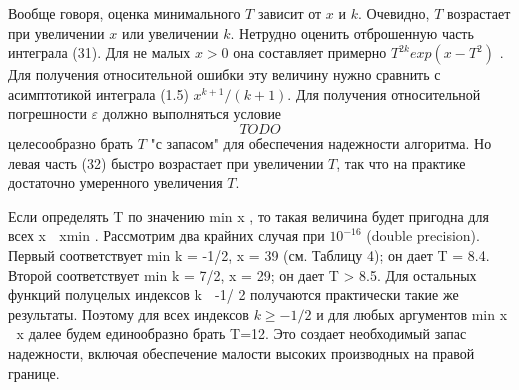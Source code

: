 Вообще говоря, оценка минимального $T$ зависит от $x$ и $k$. Очевидно,
$T$ возрастает при увеличении $x$ или увеличении $k$. Нетрудно оценить
отброшенную часть интеграла (31). Для не малых $x > 0$ она составляет
примерно  $T^{2k}exp(x-T^2)$ . Для получения относительной ошибки эту величину
нужно сравнить с асимптотикой интеграла (1.5) $x^{k+1}/(k+1)$. Для получения
относительной погрешности $\varepsilon$ должно выполняться условие
\begin{equation}
TODO
\end{equation}
целесообразно брать $T$ "с запасом" для обеспечения надежности алгоритма. Но
левая часть (32) быстро возрастает при увеличении $T$, так что на практике
достаточно умеренного увеличения $T$.

Если определять T по значению min x , то такая величина будет пригодна
для всех x  xmin . Рассмотрим два крайних случая при $10^{-16}$ (double
precision). Первый соответствует min k = -1/2, x = 39 (см. Таблицу 4); он дает
T = 8.4. Второй соответствует min k = 7/2, x = 29; он дает T > 8.5. Для
остальных функций полуцелых индексов k  -1/ 2 получаются практически
такие же результаты. Поэтому для всех индексов $k \geqslant -1/2$ и для любых
аргументов min x  x далее будем единообразно брать T=12. Это создает
необходимый запас надежности, включая обеспечение малости высоких
производных на правой границе.

